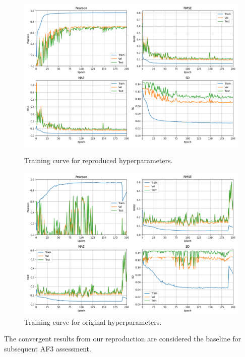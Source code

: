 \documentclass[unnumsec,webpdf,contemporary,large]{oup-authoring-template}
\theoremstyle{thmstyleone}%
\theoremstyle{thmstyletwo}%
\theoremstyle{thmstylethree}%
\begin{document}
\begin{figure}[H]
    \centering
    \begin{minipage}{0.48\textwidth}
        \centering
        \includegraphics[width=\textwidth]{images/normal_converge.png}
        \caption{Training curve for reproduced hyperparameters.}
        \label{fig:ReproducedPlot}
    \end{minipage}\hfill
    \begin{minipage}{0.48\textwidth}
        \centering
        \includegraphics[width=\textwidth]{images/origin_param.png}
        \caption{Training curve for original hyperparameters.}
        \label{fig:OriginalPlot}
    \end{minipage}
\end{figure}


The convergent results from our reproduction are considered the baseline for subsequent AF3 assessment.
\end{document}
